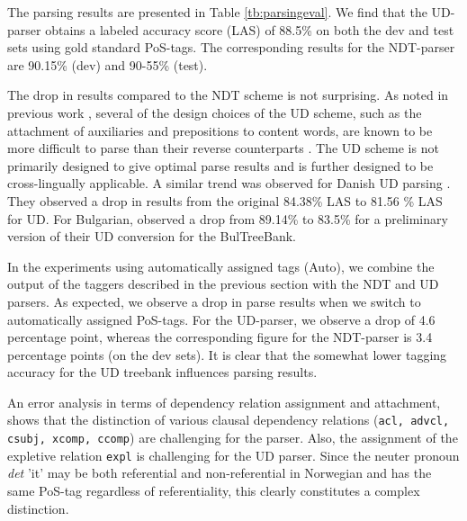 \documentclass[10pt, a4paper]{article}
\begin{document}
The parsing results are presented in Table \ref{tb:parsingeval}. We
find that the UD-parser obtains a labeled accuracy score (LAS) of
88.5\% on both the dev and test sets using gold standard PoS-tags. The
corresponding results for the NDT-parser are 90.15\% (dev) and 90-55\%
(test).


The drop in results compared to the NDT scheme is not surprising. As
noted in previous work \cite{Mar:Doz:Sil:14}, several of the design
choices of the UD scheme, such as the attachment of auxiliaries and
prepositions to content words, are known to be more difficult to parse
than their reverse counterparts \cite{Sch:Abe:Rap:12}. The UD scheme
is not primarily designed to give optimal parse results and is further
designed to be cross-lingually applicable. A similar trend was
observed for Danish UD parsing \cite{Joh:Alo:Pla:15}. They observed a
drop in results from the original 84.38\% LAS to 81.56 \% LAS for UD.
For Bulgarian,  observed a drop from 89.14\% to
83.5\% for a preliminary version of their UD conversion for the BulTreeBank.

In the experiments using automatically assigned tags (Auto), we
combine the output of the taggers described in the previous section
with the NDT and UD parsers. As expected, we observe a drop in parse
results when we switch to automatically assigned PoS-tags. For the
UD-parser, we observe a drop of 4.6 percentage point, whereas the
corresponding figure for the NDT-parser is 3.4 percentage points (on
the dev sets). It is clear that the somewhat lower tagging accuracy
for the UD treebank influences parsing results. 

An error analysis in terms of dependency relation assignment and
attachment, shows that the distinction of various clausal dependency
relations ({\tt acl, advcl, csubj, xcomp, ccomp}) are challenging for
the parser. Also, the assignment of the expletive relation {\tt expl}
is challenging for the UD parser. Since the neuter pronoun {\it det}
'it' may be both referential and non-referential in Norwegian and has the same
PoS-tag regardless of referentiality, this clearly constitutes a
complex distinction.
\end{document}
